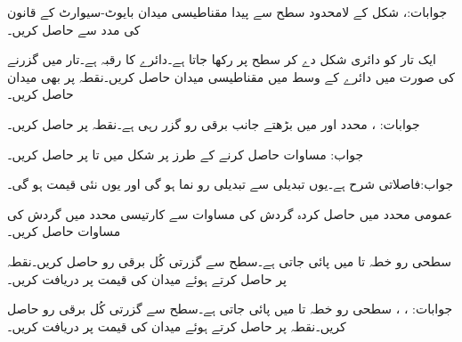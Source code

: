 جوابات:، 
شکل  کے لامحدود سطح سے پیدا مقناطیسی میدان بایوٹ-سیوارٹ کے قانون کی مدد سے حاصل کریں۔

ایک تار کو دائری شکل دے کر سطح  پر رکھا جاتا ہے۔دائرے کا رقبہ  ہے۔تار میں  گزرنے کی صورت میں دائرے کے وسط  میں مقناطیسی میدان  حاصل کریں۔نقطہ  پر بھی میدان حاصل کریں۔

جوابات: ، 
محدد  اور  میں بڑھتے جانب  برقی رو گزر رہی ہے۔نقطہ  پر  حاصل کریں۔

جواب:
مساوات  حاصل کرنے کے طرز پر شکل  میں  تا  پر  حاصل کریں۔

جواب:فاصلاتی شرح  ہے۔یوں  تبدیلی سے   تبدیلی رو نما ہو گی اور یوں نئی قیمت 
{} ہو گی۔

عمومی محدد میں حاصل کردہ گردش کی مساوات سے کارتیسی محدد میں گردش کی مساوات حاصل کریں۔

سطحی رو  خطہ  تا  میں پائی جاتی ہے۔سطح  سے گزرتی کُل برقی رو حاصل کریں۔نقطہ  پر  حاصل کرتے ہوئے میدان کی قیمت  پر دریافت کریں۔

جوابات: ، ، 
سطحی رو  خطہ  تا  میں پائی جاتی ہے۔سطح  سے گزرتی کُل برقی رو حاصل کریں۔نقطہ  پر  حاصل کرتے ہوئے میدان کی قیمت  پر دریافت کریں۔

